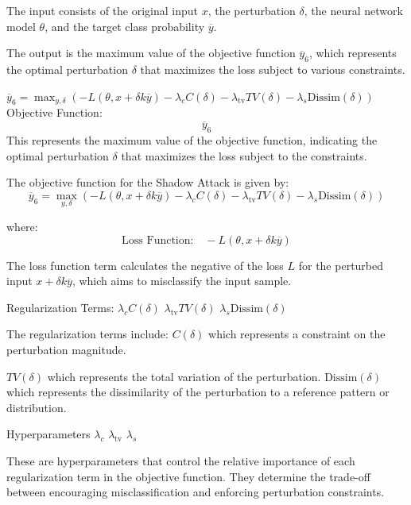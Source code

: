 
The input consists of the original input $x$, the perturbation $\delta$, the neural network model $\theta$, and the target class probability $\overline{y}$.

The output is the maximum value of the objective function $\overline{y}_6$, which represents the optimal perturbation $\delta$ that maximizes the loss subject to various constraints.

$\overline{y}_6 = \max_{y, \delta} \left( -L(\theta, x + \delta k \overline{y}) - \lambda_c C(\delta) - \lambda_{\text{tv}} TV(\delta) - \lambda_s \text{Dissim}(\delta) \right)$
Objective Function:
\begin{equation*}
\overline{y}_6
\end{equation*}
This represents the maximum value of the objective function, indicating the optimal perturbation \(\delta\) that maximizes the loss subject to the constraints.

The objective function for the Shadow Attack is given by:
\begin{equation*}
\overline{y}_6 = \max_{y, \delta} \left( -L(\theta, x + \delta k \overline{y}) - \lambda_c C(\delta) - \lambda_{\text{tv}} TV(\delta) - \lambda_s \text{Dissim}(\delta) \right)
\end{equation*}

where:
\begin{equation*}
\text{Loss Function:} \quad -L(\theta, x + \delta k \overline{y})
\end{equation*}

The loss function term calculates the negative of the loss $L$ for the perturbed input $x + \delta k \overline{y}$, which aims to misclassify the input sample.

Regularization Terms:
$\lambda_c C(\delta)$
$\lambda_{\text{tv}} TV(\delta)$
$\lambda_s \text{Dissim}(\delta)$


The regularization terms include:
$C(\delta)$
which represents a constraint on the perturbation magnitude.

$TV(\delta)$
which represents the total variation of the perturbation.
$\text{Dissim}(\delta)$which represents the dissimilarity of the perturbation to a reference pattern or distribution.

Hyperparameters
$\lambda_c$
$\lambda_{\text{tv}}$ 
$\lambda_s$

These are hyperparameters that control the relative importance of each regularization term in the objective function. They determine the trade-off between encouraging misclassification and enforcing perturbation constraints.

